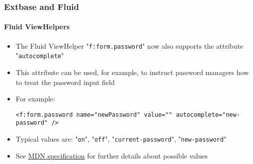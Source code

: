 %

\begin{frame}[fragile]
	\frametitle{Extbase and Fluid}
	\framesubtitle{Fluid ViewHelpers}


	\begin{itemize}
		\item The Fluid ViewHelper "\texttt{f:form.password}" now also supports
			the attribute "\texttt{autocomplete}"
		\item This attribute can be used, for example, to instruct password
			managers how to treat the password input field
		\item For example:
\begin{lstlisting}
<f:form.password name="newPassword" value="" autocomplete="new-password" />
\end{lstlisting}

		\item Typical values are:\newline
			\small"\texttt{on}", "\texttt{off}", "\texttt{current-password}", "\texttt{new-password}"\normalsize
		\item See
			\href{https://developer.mozilla.org/en-US/docs/Web/HTML/Element/input/password#allowing\_autocomplete}{MDN specification}
			for further details about possible values

	\end{itemize}

\end{frame}


